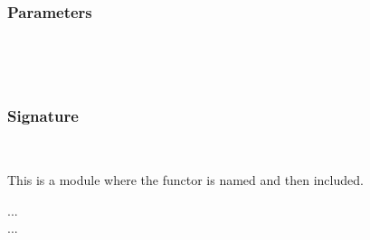 \label{Oxcaml--module-Include_functor_named_type_desugared}\label{Oxcaml-Include_functor_named_type_desugared}\begin{ocamlindent}\label{Oxcaml-Include_functor_named_type_desugared--module-type-MakeType}\label{Oxcaml-Include_functor_named_type_desugared-module-type-MakeType}\begin{ocamlindent}\subsubsection{Parameters\label{Oxcaml-Include_functor_named_type_desugared-module-type-MakeType--parameters_3}}%
\label{Oxcaml-Include_functor_named_type_desugared-module-type-MakeType--argument-1-_}\label{Oxcaml-Include_functor_named_type_desugared-module-type-MakeType-argument-1-_}\begin{ocamlindent}\label{Oxcaml-Include_functor_named_type_desugared-module-type-MakeType-argument-1-_--type-t}\\
\end{ocamlindent}%
\\
\subsubsection{Signature\label{Oxcaml-Include_functor_named_type_desugared-module-type-MakeType--signature_3}}%
\label{Oxcaml-Include_functor_named_type_desugared-module-type-MakeType--type-included}\\
\end{ocamlindent}%
\begin{ocamlindent}This is a module where the functor is named and then included.\end{ocamlindent}%
\medbreak
{} .\allowbreak{}.\allowbreak{}.\allowbreak{}\label{Oxcaml-Include_functor_named_type_desugared--type-t}\\
  .\allowbreak{}.\allowbreak{}.\allowbreak{} \label{Oxcaml-Include_functor_named_type_desugared--type-included}\\
\end{ocamlindent}%
